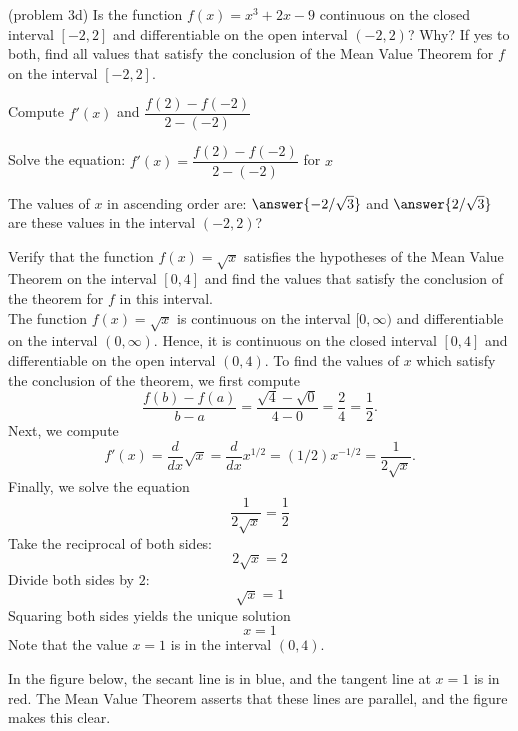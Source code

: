 \documentclass[handout]{ximera}
\begin{document}
\begin{problem}(problem 3d)
  Is the function $f(x) = x^3 + 2x -9$ continuous on the closed interval $[-2,2]$ and differentiable on the open interval $(-2,2)$? Why?
  If yes to both, find all values that satisfy the conclusion of the Mean Value Theorem for $f$ on the interval $[-2,2]$.
  	
    \begin{hint}
      Compute $f'(x)$ and $\dfrac{f(2) - f(-2)}{2-(-2)}$
    \end{hint}
		\begin{hint}
		  Solve the equation: $f'(x) = \dfrac{f(2) - f(-2)}{2-(-2)}$ for $x$
		\end{hint}
		
		The values of $x$ in ascending order are:
		 $\answer{-2/\sqrt 3}$ and $\answer{2/\sqrt 3}$
     are these values in the interval $(-2,2)$?
\end{problem}




\begin{example}[example 4]
Verify that the function $f(x) = \sqrt x$ satisfies the hypotheses of the Mean Value Theorem
on the interval $[0,4]$ and find the values that satisfy the conclusion of the theorem for $f$ in this interval.\\
The function $f(x) = \sqrt x$ is continuous on the interval $[0, \infty)$  and differentiable on the interval $(0, \infty)$. 
Hence, it is continuous on the closed interval $[0, 4]$ and differentiable on the open interval $(0, 4)$. 
To find the values of $x$ which satisfy the conclusion of the theorem, we first compute
\[\frac{f(b) - f(a)}{b-a} = \frac{\sqrt 4 - \sqrt 0}{4-0} = \frac{2}{4} = \frac{1}{2}.\]
Next, we compute
\[f'(x) = \frac{d}{dx} \sqrt x = \frac{d}{dx} x^{1/2} = (1/2)x^{-1/2} = \frac{1}{2\sqrt x}.\]
Finally, we solve the equation
\[\frac{1}{2\sqrt x} = \frac{1}{2}\]
Take the reciprocal of both sides:
\[2\sqrt x = 2\]
Divide both sides by $2$: 
\[\sqrt x = 1\]
Squaring both sides yields the unique solution
\[ x=1\]
Note that the value $x = 1$ is in the interval $(0,4)$.

In the figure below, the secant line is in blue, 
and the tangent line at $x = 1$ is in red. The Mean Value Theorem asserts that these lines are parallel, and the figure makes this clear.

\begin{image}
\end{image}


\end{example}
\end{document}
